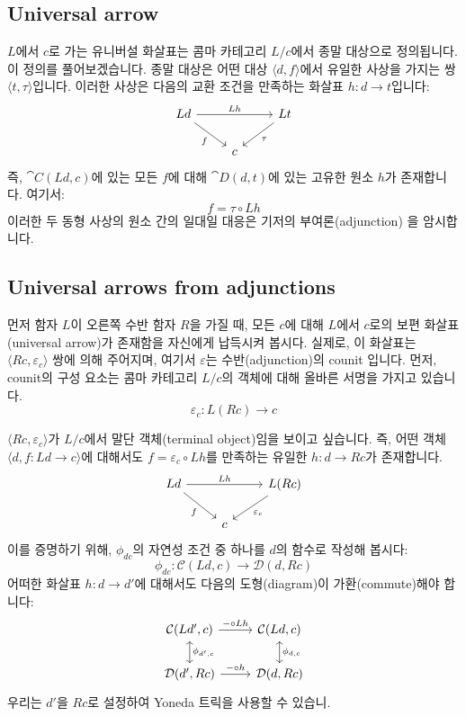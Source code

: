 \documentclass[DaoFP]{subfiles}
\begin{document}
\subsection{Universal arrow}

$L$에서 $c$로 가는 유니버설 화살표는 콤마 카테고리 $L / c$에서 종말 대상으로 정의됩니다. 이 정의를 풀어보겠습니다. 종말 대상은 어떤 대상 $\langle d, f \rangle$에서 유일한 사상을 가지는 쌍 $\langle t, \tau \rangle$입니다. 이러한 사상은 다음의 교환 조건을 만족하는 화살표 $h \colon d \to t$입니다:
\[
 \begin{tikzcd}
 L d
 \arrow[rd, "f"']
 \arrow[rr, "L h"]
 && L t
 \arrow[ld, "\tau"]
 \\
 &c
  \end{tikzcd}
\]
즉, $\cat C (L d, c)$에 있는 모든 $f$에 대해 $\cat D (d, t)$에 있는 고유한 원소 $h$가 존재합니다. 여기서:
\[ f = \tau \circ L h \]
이러한 두 동형 사상의 원소 간의 일대일 대응은 기저의 부여론(adjunction) 을 암시합니다.

\subsection{Universal arrows from adjunctions}

먼저 함자 $L$이 오른쪽 수반 함자 $R$을 가질 때, 모든 $c$에 대해 $L$에서 $c$로의 보편 화살표(universal arrow)가 존재함을 자신에게 납득시켜 봅시다. 실제로, 이 화살표는 $\langle R c, \varepsilon_c \rangle$ 쌍에 의해 주어지며, 여기서 $\varepsilon$는 수반(adjunction)의 counit 입니다. 먼저, counit의 구성 요소는 콤마 카테고리 $L/c$의 객체에 대해 올바른 서명을 가지고 있습니다.
\[ \varepsilon_c \colon L (R c) \to c \]

$\langle R c, \varepsilon_c \rangle$가 $L/c$에서 말단 객체(terminal object)임을 보이고 싶습니다. 즉, 어떤 객체 $\langle d, f \colon L d \to c \rangle$에 대해서도 $f = \varepsilon_c \circ L h$를 만족하는 유일한 $h \colon d \to R c$가 존재합니다.
\[
 \begin{tikzcd}
 L d
 \arrow[rd, "f"']
 \arrow[rr, "L h"]
 && L (R c)
 \arrow[ld, "\varepsilon_c"]
 \\
 &c
  \end{tikzcd}
\]
이를 증명하기 위해, $\phi_{d c}$의 자연성 조건 중 하나를 $d$의 함수로 작성해 봅시다:
\[  \phi_{d c} \colon \mathcal{C} (L d, c) \to \mathcal{D}( d , R c)\]
어떠한 화살표 $h \colon d \to d'$에 대해서도 다음의 도형(diagram)이 가환(commute)해야 합니다:
\[
 \begin{tikzcd}
 \mathcal{C}(L d', c)
 \arrow[d, leftrightarrow, "\phi_{d', c}"]
 \arrow[r, "- \circ L h"]
 &
 \mathcal{C}(L d, c)
  \arrow[d, leftrightarrow, "\phi_{d, c}"]
 \\
 \mathcal{D}(d', R c)
 \arrow[r, "- \circ h"]
& \mathcal{D}(d, R c)
 \end{tikzcd}
\]
우리는 $d'$을 $R c$로 설정하여 Yoneda 트릭을 사용할 수 있습니.
\end{document}
